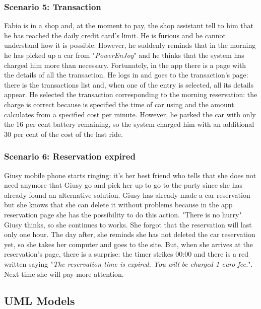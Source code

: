 \subsubsection{Scenario 5: Transaction} \label{sce5}
Fabio is in a shop and, at the moment to pay, the shop assistant tell to him that he has reached the daily credit card's limit. He is furious and he cannot understand how it is possible. However, he suddenly reminds that in the morning he has picked up a car from "\textit{PowerEnJoy}" and he thinks that the system has charged him more than necessary. Fortunately, in the app there is a page with the details of all the transaction. He logs in and goes to the transaction's page: there is the transactions list and, when one of the entry is selected, all its details appear. He selected the transaction corresponding to the morning reservation: the charge is correct because is specified the time of car using and the amount calculates from a specified cost per minute. 
However, he parked the car with only the 16 per cent battery remaining, so the system charged him with an additional 30 per cent of the cost of the last ride.
\subsubsection{Scenario 6: Reservation expired} \label{sce6}
Giusy mobile phone starts ringing: it's her best friend who tells that she does not need 
anymore that Giusy go and pick her up to go to the party since she has already found an alternative solution.
Giusy has already made a car reservation but she knows that she can delete it without problems because in the app reservation page she has the possibility to do this action. "There is no hurry" Giusy thinks, so she continues to works. She forgot that the reservation will last only one hour. The day after, she reminds she has not deleted the car reservation yet, so she takes her computer and goes to the site. But, when she arrives at the reservation's page, there is a surprise: the timer strikes 00:00 and there is a red written saying "\textit{The reservation time is expired. You will be charged 1 euro fee.}". Next time she will pay more attention. 
\clearpage  


\subsection{UML Models}
